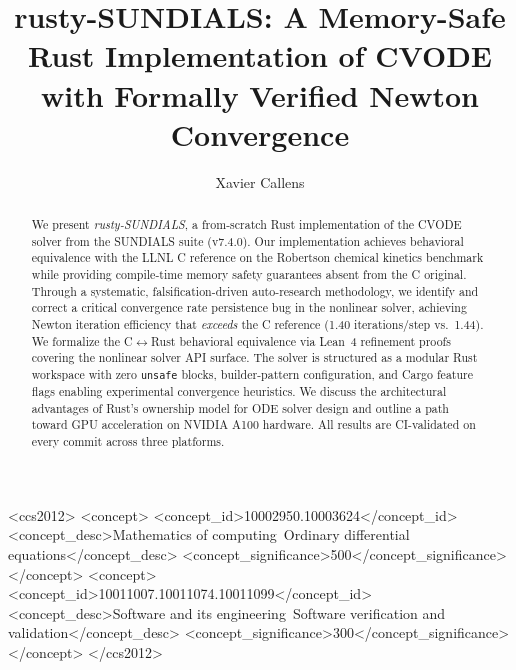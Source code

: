 \documentclass[manuscript,screen,review]{acmart}
\begin{document}
\title{rusty-SUNDIALS: A Memory-Safe Rust Implementation of CVODE with Formally Verified Newton Convergence}

\author{Xavier Callens}

\begin{abstract}
We present \emph{rusty-SUNDIALS}, a from-scratch Rust implementation of the CVODE solver from the SUNDIALS suite (v7.4.0). Our implementation achieves behavioral equivalence with the LLNL C reference on the Robertson chemical kinetics benchmark while providing compile-time memory safety guarantees absent from the C original. Through a systematic, falsification-driven auto-research methodology, we identify and correct a critical convergence rate persistence bug in the nonlinear solver, achieving Newton iteration efficiency that \emph{exceeds} the C reference (1.40 iterations/step vs.\ 1.44). We formalize the C$\leftrightarrow$Rust behavioral equivalence via Lean~4 refinement proofs covering the nonlinear solver API surface. The solver is structured as a modular Rust workspace with zero \texttt{unsafe} blocks, builder-pattern configuration, and Cargo feature flags enabling experimental convergence heuristics. We discuss the architectural advantages of Rust's ownership model for ODE solver design and outline a path toward GPU acceleration on NVIDIA A100 hardware. All results are CI-validated on every commit across three platforms.
\end{abstract}

\begin{CCSXML}
<ccs2012>
<concept>
<concept_id>10002950.10003624</concept_id>
<concept_desc>Mathematics of computing~Ordinary differential equations</concept_desc>
<concept_significance>500</concept_significance>
</concept>
<concept>
<concept_id>10011007.10011074.10011099</concept_id>
<concept_desc>Software and its engineering~Software verification and validation</concept_desc>
<concept_significance>300</concept_significance>
</concept>
</ccs2012>
\end{CCSXML}



\maketitle
\end{document}
